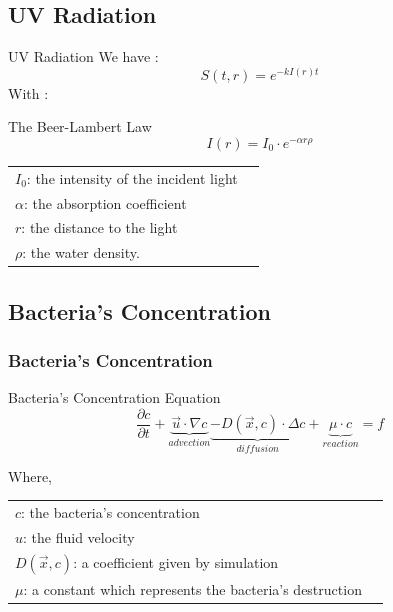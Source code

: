 \documentclass[xcolor=dvipsnames,10pt]{beamer}
\begin{document}
\subsection{UV Radiation}

\begin{frame}{UV Radiation}
We have : 
\begin{equation}
	S(t,r)=e^{-kI(r)t}
\end{equation}
With :
\begin{block}{The Beer-Lambert Law}
	\begin{equation}
		I(r) = I_0 \cdot e^{-\alpha r \rho}
	\end{equation}
\end{block}
\vspace{2mm}
	\begin{tabular}{ll}
		$I_0$: the intensity of the incident light\\
		$\alpha$: the absorption coefficient\\
		$r$: the distance to the light\\
		$\rho$: the water density.
	\end{tabular}
\end{frame}

\subsection{Bacteria's Concentration}

\begin{frame}
	\frametitle{Bacteria's Concentration}
\begin{block}{Bacteria's Concentration Equation}
\begin{equation}
\frac{\partial{c}}{\partial{t}} + \underbrace{\vec{u}\cdot \nabla c}_{advection} \underbrace{ - D(\vec{x},c)\cdot \Delta c}_{diffusion} + \underbrace{\mu\cdot c}_{reaction} = f
\end{equation}
\end{block}
Where,
\begin{tabular}{ll}
	$c$: the bacteria's concentration\\
	$u$: the fluid velocity\\
	$D(\vec{x},c)$: a coefficient given by simulation\\
	$\mu$: a constant which represents the bacteria's destruction
\end{tabular}
\end{frame}

\end{document}
